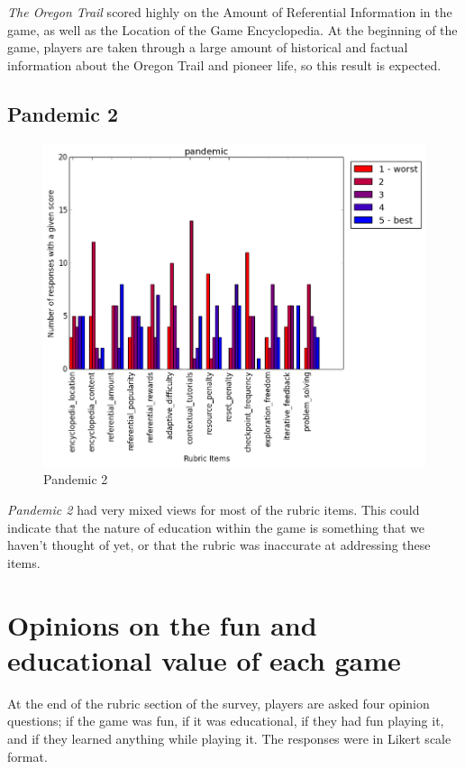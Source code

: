 				\textit{The Oregon Trail} scored highly on the Amount of Referential Information in the game, as well as the Location of the Game Encyclopedia. At the beginning of the game, players are taken through a large amount of historical and factual information about the Oregon Trail and pioneer life, so this result is expected.

			\subsection{Pandemic 2}

				\begin{figure}[] 
				\centering 
				\includegraphics[width=\textwidth, height=.4\textheight, keepaspectratio=true]{pandemic_scores.png} 
				\caption{Pandemic 2}
				\end{figure}

				\textit{Pandemic 2} had very mixed views for most of the rubric items. This could indicate that the nature of education within the game is something that we haven't thought of yet, or that the rubric was inaccurate at addressing these items.

			\clearpage

		\section{Opinions on the fun and educational value of each game}

			At the end of the rubric section of the survey, players are asked four opinion questions; if the game was fun, if it was educational, if they had fun playing it, and if they learned anything while playing it. The responses were in Likert scale format.

